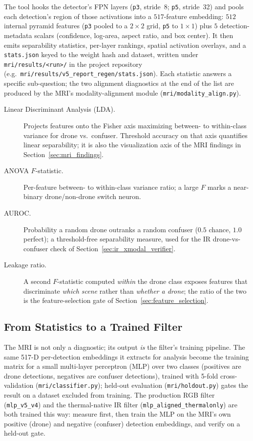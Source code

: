 The tool hooks the detector's FPN layers (\texttt{p3}, stride~8; \texttt{p5}, stride~32) and pools each detection's region of those activations into a $517$-feature embedding: $512$ internal pyramid features (\texttt{p3} pooled to a $2{\times}2$ grid, \texttt{p5} to $1{\times}1$) plus $5$ detection-metadata scalars (confidence, log-area, aspect ratio, and box center). It then emits separability statistics, per-layer rankings, spatial activation overlays, and a \texttt{stats.json} keyed to the weight hash and dataset, written under \texttt{mri/results/<run>/} in the project repository (e.g.\ \texttt{mri/results/v5\_report\_regen/stats.json}). Each statistic answers a specific sub-question; the two alignment diagnostics at the end of the list are produced by the MRI's modality-alignment module (\texttt{mri/modality\_align.py}).

\begin{description}
    \item[Linear Discriminant Analysis (LDA).] Projects features onto the Fisher axis maximizing between- to within-class variance for drone vs.\ confuser. Threshold accuracy on that axis quantifies linear separability; it is also the visualization axis of the MRI findings in Section~\ref{sec:mri_findings}.
    \item[ANOVA $F$-statistic.] Per-feature between- to within-class variance ratio; a large $F$ marks a near-binary drone/non-drone switch neuron.
    \item[AUROC.] Probability a random drone outranks a random confuser ($0.5$ chance, $1.0$ perfect); a threshold-free separability measure, used for the IR drone-vs-confuser check of Section~\ref{sec:ir_xmodal_verifier}.
    \item[Leakage ratio.] A second $F$-statistic computed \emph{within} the drone class exposes features that discriminate \emph{which scene} rather than \emph{whether a drone}; the ratio of the two is the feature-selection gate of Section~\ref{sec:feature_selection}.
\end{description}

\subsection{From Statistics to a Trained Filter}

The MRI is not only a diagnostic; its output \emph{is} the filter's training pipeline. The same 517-D per-detection embeddings it extracts for analysis become the training matrix for a small multi-layer perceptron (MLP) over two classes (positives are drone detections, negatives are confuser detections), trained with 5-fold cross-validation (\texttt{mri/classifier.py}); held-out evaluation (\texttt{mri/holdout.py}) gates the result on a dataset excluded from training. The production RGB filter (\texttt{mlp\_v5\_v4}) and the thermal-native IR filter (\texttt{mlp\_aligned\_thermalonly}) are both trained this way: measure first, then train the MLP on the MRI's own positive (drone) and negative (confuser) detection embeddings, and verify on a held-out gate.

